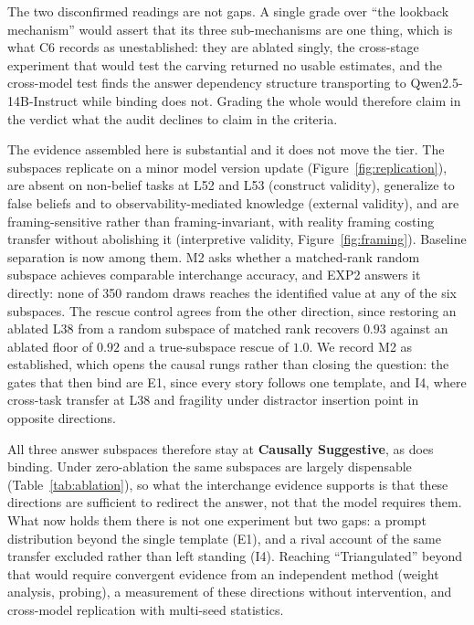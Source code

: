 \documentclass{article}
\begin{document}
The two disconfirmed readings are not gaps. A single grade over ``the lookback mechanism''
would assert that its three sub-mechanisms are one thing, which is what C6 records as
unestablished: they are ablated singly, the cross-stage experiment that would test the
carving returned no usable estimates, and the cross-model test finds the answer dependency structure
transporting to Qwen2.5-14B-Instruct while binding does not. Grading the whole would
therefore claim in the verdict what the audit declines to claim in the criteria.

The evidence assembled here is substantial and it does not move the tier. The subspaces
replicate on a minor model version update (Figure~\ref{fig:replication}), are absent on
non-belief tasks at L52 and L53 (construct validity), generalize to false beliefs and to
observability-mediated knowledge (external validity), and are framing-sensitive rather than
framing-invariant, with reality framing costing transfer without abolishing it (interpretive
validity, Figure~\ref{fig:framing}). Baseline separation is now among them. M2 asks whether a
matched-rank random subspace achieves comparable interchange accuracy, and EXP2 answers it
directly: none of 350 random draws reaches the identified value at any of the six subspaces.
The rescue control agrees from the other direction, since restoring an ablated L38 from a
random subspace of matched rank recovers $0.93$ against an ablated floor of $0.92$ and a
true-subspace rescue of $1.0$. We record M2 as established, which opens the causal rungs
rather than closing the question: the gates that then bind are E1, since every story follows
one template, and I4, where cross-task transfer at L38 and fragility under distractor
insertion point in opposite directions.

All three answer subspaces therefore stay at \textbf{Causally Suggestive}, as does binding.
Under zero-ablation the same subspaces are largely dispensable (Table~\ref{tab:ablation}),
so what the interchange evidence supports is that these directions are sufficient to redirect
the answer, not that the model requires them. What now holds them there is not one
experiment but two gaps: a prompt distribution beyond the single template (E1), and a rival
account of the same transfer excluded rather than left standing (I4). Reaching ``Triangulated''
beyond that would require convergent evidence from an independent method (weight analysis,
probing), a measurement of these directions without intervention, and cross-model replication
with multi-seed statistics.
\end{document}
